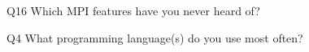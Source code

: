 \begin{description}%
\item{Q16} Which MPI features have you never heard of?%
\item{Q4} What programming language(s) do you use most often?%
\end{description}%
